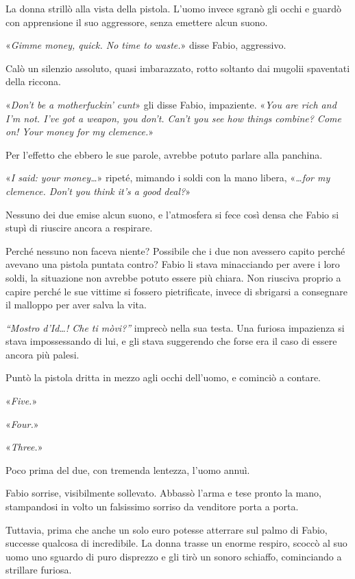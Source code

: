 La donna strillò alla vista della pistola. L'uomo invece sgranò gli occhi e guardò con apprensione il suo aggressore, senza emettere alcun suono.

«\textit{Gimme money, quick. No time to waste.}» disse Fabio, aggressivo.

Calò un silenzio assoluto, quasi imbarazzato, rotto soltanto dai mugolii spaventati della riccona.

«\textit{Don't be a motherfuckin' cunt}» gli disse Fabio, impaziente. «\textit{You are rich and I'm not. I've got a weapon, you don't. Can't you see how things combine? Come on! Your money for my clemence.}»

Per l'effetto che ebbero le sue parole, avrebbe potuto parlare alla panchina.

«\textit{I said: your money\ldots}» ripeté, mimando i soldi con la mano libera, «\textit{\ldots for my clemence. Don't you think it's a good deal?}»

Nessuno dei due emise alcun suono, e l'atmosfera si fece così densa che Fabio si stupì di riuscire ancora a respirare. 

Perché nessuno non faceva niente? Possibile che i due non avessero capito perché avevano una pistola puntata contro? Fabio li stava minacciando per avere i loro soldi, la situazione non avrebbe potuto essere più chiara. Non riusciva proprio a capire perché le sue vittime si fossero pietrificate, invece di sbrigarsi a consegnare il malloppo per aver salva la vita.

\textit{``Mostro d'Id\ldots! Che ti mòvi?''} imprecò nella sua testa. Una furiosa impazienza si stava impossessando di lui, e gli stava suggerendo che forse era il caso di essere ancora più palesi.

Puntò la pistola dritta in mezzo agli occhi dell'uomo, e cominciò a contare.

«\textit{Five.}»

«\textit{Four.}»

«\textit{Three.}»

Poco prima del due, con tremenda lentezza, l'uomo annuì. 

Fabio sorrise, visibilmente sollevato. Abbassò l'arma e tese pronto la mano, stampandosi in volto un falsissimo sorriso da venditore porta a porta. 

Tuttavia, prima che anche un solo euro potesse atterrare sul palmo di Fabio, successe qualcosa di incredibile. La donna trasse un enorme respiro, scoccò al suo uomo uno sguardo di puro disprezzo e gli tirò un sonoro schiaffo, cominciando a strillare furiosa.

